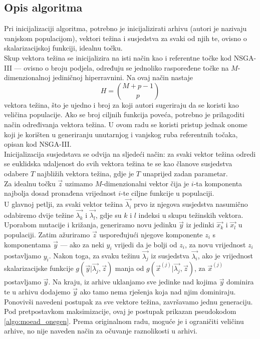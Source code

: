 \documentclass[times, utf8, zavrsni, numeric]{fer}
\begin{document}
\subsection{Opis algoritma}
Pri inicijalizaciji algoritma, potrebno je inicijalizirati arhivu (autori je nazivaju vanjskom populacijom), vektori težina i susjedstva za svaki od njih te, ovisno o skalarizacijskoj funkciji, idealnu točku. \\
Skup vektora težina se inicijalizira na isti način kao i referentne točke kod NSGA-III --- ovisno o broju podjela, određuju se jednoliko raspoređene točke na $M$-dimenzionalnoj jediničnoj hiperravnini. Na ovaj način nastaje
\begin{equation*}
H = \binom{M + p - 1}{p}
\end{equation*}  
vektora težina, što je ujedno i broj za koji autori sugeriraju da se koristi kao veličina populacije. Ako se broj ciljnih funkcija poveća, potrebno je prilagoditi način određivanja vektora težina. U ovom radu se koristi pristup jednak onome koji je korišten u generiranju unutarnjog i vanjskog ruba referentnih točaka, opisan kod NSGA-III.\\
Inicijalizacija susjedstava se odvija na sljedeći način: za svaki vektor težina odredi se euklidska udaljenost do svih vektora težina te se kao članove susjedstva odabere $T$ najbližih vektora težina, gdje je $T$ unaprijed zadan parametar. \\
Za idealnu točku $\vec{z}$ uzimamo $M$-dimenzionalni vektor čija je $i$-ta komponenta najbolja dosad pronađena vrijednost $i$-te ciljne funkcije u populaciji.\\
U glavnoj petlji, za svaki vektor težina $\vec{\lambda_i}$ prvo iz njegova susjedstva nasumično odabiremo dvije težine $\vec{\lambda_k}$ i $\vec{\lambda_l}$, gdje su $k$ i $l$ indeksi u skupu težinskih vektora. Uporabom mutacije i križanja, generiramo novu jedinku $\vec{y}$ iz jedinki $\vec{x_k}$ i $\vec{x_l}$ u populaciji.    Zatim ažuriramo $\vec{z}$ uspoređujući njegove komponente $z_i$ s komponentama $\vec{y}$ --- ako za neki $y_i$ vrijedi da je bolji od $z_i$, za novu vrijednost $z_i$ postavljamo $y_i$. Nakon toga, za svaku težinu $\vec{\lambda_j}$ iz susjedstva $\vec{\lambda_i}$, ako je vrijednost skalarizacijske funkcije $g(\vec{y}\vert\vec{\lambda_j},\vec{z})$ manja od $g(\vec{x}^{(j)}\vert\vec{\lambda_j},\vec{z})$, za $\vec{x}^{(j)}$ postavljamo $\vec{y}$. Na kraju, iz arhive uklanjamo sve jedinke nad kojima $\vec{y}$ dominira te u arhivu dodajemo $\vec{y}$ ako tamo nema rješenja koja nad njim dominiraju. 
Ponovivši navedeni postupak za sve vektore težina, završavamo jednu generaciju. Pod pretpostavkom maksimizacije, ovaj je postupak prikazan pseudokodom \ref{algo:moead_onegen}. Prema originalnom radu, moguće je i ograničiti veličinu arhive, no nije naveden način za očuvanje raznolikosti u arhivi. 
\end{document}
